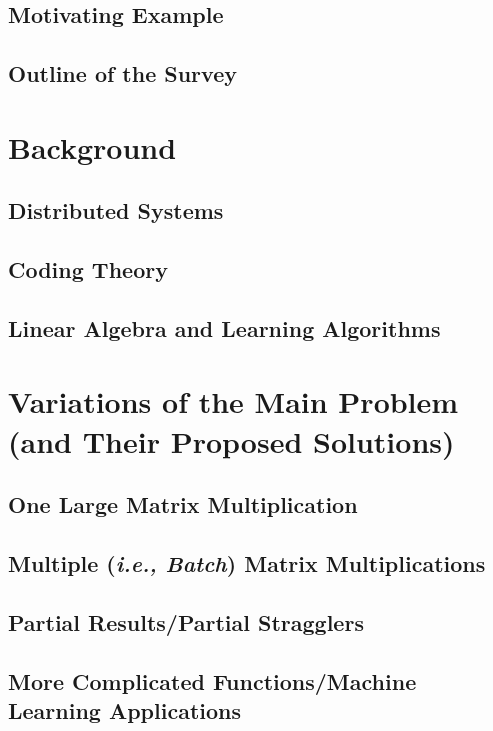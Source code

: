 \documentclass{report}
\begin{document}
\section{Motivating Example}\label{sec:mot_ex}


\section{Outline of the Survey}

\chapter{Background}

\section{Distributed Systems}

\section{Coding Theory}


\section{Linear Algebra and Learning Algorithms}



\chapter{Variations of the Main Problem ({and Their Proposed Solutions})}

\section{One Large Matrix Multiplication}

\section{Multiple (\emph{i.e., Batch}) Matrix Multiplications}

\section{Partial Results/Partial Stragglers}

\section{More Complicated Functions/Machine Learning Applications}
\end{document}
